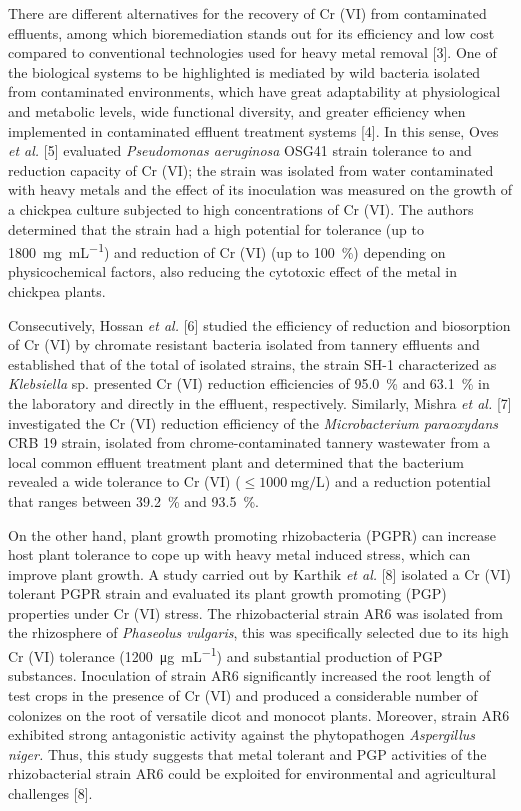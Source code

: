 \documentclass{univsciauth}
\begin{document}
There are different alternatives for the recovery of Cr (VI) from
contaminated effluents, among which bioremediation stands out for its
efficiency and low cost compared to conventional technologies used for
heavy metal removal {[}3{]}. One of the biological systems to be
highlighted is mediated by wild bacteria isolated from contaminated
environments, which have great adaptability at physiological and
metabolic levels, wide functional diversity, and greater efficiency when
implemented in contaminated effluent treatment systems {[}4{]}. In this
sense, Oves \emph{et al.} {[}5{]} evaluated \emph{Pseudomonas
aeruginosa} OSG41 strain tolerance to and reduction capacity of Cr (VI);
the strain was isolated from water contaminated with heavy metals and
the effect of its inoculation was measured on the growth of a chickpea
culture subjected to high concentrations of Cr (VI). The authors
determined that the strain had a high potential for tolerance (up to
\SI{1800}{\milli\gram\per\milli\liter}) and reduction of Cr (VI)
(up to \SI{100}{\%}) depending on physicochemical factors, also reducing the
cytotoxic effect of the metal in chickpea plants.

Consecutively, Hossan \emph{et al.} {[}6{]} studied the efficiency of
reduction and biosorption of Cr (VI) by chromate resistant bacteria
isolated from tannery effluents and established that of the total of
isolated strains, the strain SH-1 characterized as \emph{Klebsiella} sp.
presented Cr (VI) reduction efficiencies of \SI{95.0}{\%} and \SI{63.1}{\%} in the
laboratory and directly in the effluent, respectively. Similarly, Mishra
\emph{et al.} {[}7{]} investigated the Cr (VI) reduction efficiency of
the \emph{Microbacterium paraoxydans} CRB 19 strain, isolated from
chrome-contaminated tannery wastewater from a local common effluent
treatment plant and determined that the bacterium revealed a wide
tolerance to Cr (VI) ($\le \SI{1000}{\milli\gram\per\liter}$) and a reduction
potential that ranges between \SI{39.2}{\%} and \SI{93.5}{\%}.

On the other hand, plant growth promoting rhizobacteria (PGPR) can
increase host plant tolerance to cope up with heavy metal induced
stress, which can improve plant growth. A study carried out by Karthik
\emph{et al.} {[}8{]} isolated a Cr (VI) tolerant PGPR strain and
evaluated its plant growth promoting (PGP) properties under Cr (VI)
stress. The rhizobacterial strain AR6 was isolated from the rhizosphere
of \emph{Phaseolus vulgaris}, this was specifically selected due to its
high Cr (VI) tolerance (\SI{1200}{\micro\gram\per\milli\liter}) and substantial
production of PGP
substances. Inoculation of strain AR6 significantly increased the root
length of test crops in the presence of Cr (VI) and produced a
considerable number of colonizes on the root of versatile dicot and
monocot plants. Moreover, strain AR6 exhibited strong antagonistic
activity against the phytopathogen \emph{Aspergillus niger.} Thus, this
study suggests that metal tolerant and PGP activities of the
rhizobacterial strain AR6 could be exploited for environmental and
agricultural challenges {[}8{]}.
\end{document}
